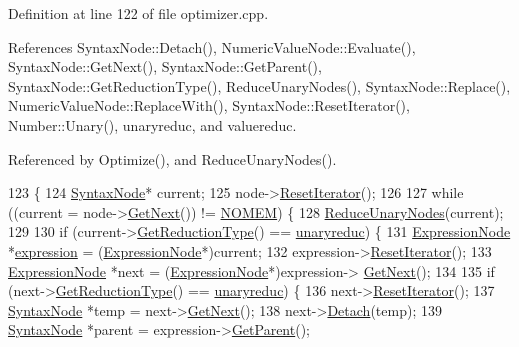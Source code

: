 Definition at line 122 of file optimizer.\+cpp.



References Syntax\+Node\+::\+Detach(), Numeric\+Value\+Node\+::\+Evaluate(), Syntax\+Node\+::\+Get\+Next(), Syntax\+Node\+::\+Get\+Parent(), Syntax\+Node\+::\+Get\+Reduction\+Type(), Reduce\+Unary\+Nodes(), Syntax\+Node\+::\+Replace(), Numeric\+Value\+Node\+::\+Replace\+With(), Syntax\+Node\+::\+Reset\+Iterator(), Number\+::\+Unary(), unaryreduc, and valuereduc.



Referenced by Optimize(), and Reduce\+Unary\+Nodes().


\begin{DoxyCode}
123 \{
124     \hyperlink{classSyntaxNode}{SyntaxNode}* current;
125     node->\hyperlink{classSyntaxNode_ac51307368fb255aa760b99e137178c89}{ResetIterator}();
126 
127     \textcolor{keywordflow}{while} ((current = node->\hyperlink{classSyntaxNode_af1fa46ba30aa4f2affa2d4e96a4be010}{GetNext}()) != \hyperlink{platform_8h_a46ff2bfbf0d44b8466a2251d5bd5e6f8}{NOMEM}) \{
128         \hyperlink{classOptimizer_aef8d80bb6301ee01a7ed271148438733}{ReduceUnaryNodes}(current);
129 
130         \textcolor{keywordflow}{if} (current->\hyperlink{classSyntaxNode_a5384fc779eee947b5e09bf2adb6cc606}{GetReductionType}() == \hyperlink{nodes_8h_ab321a69ad5704b704b8dd9e1b3984a29aba5ebaece27f25a5bb9dcdc5eb89846e}{unaryreduc}) \{
131             \hyperlink{classExpressionNode}{ExpressionNode} *\hyperlink{nodes_8h_acac9cbaeea226ed297804c012dc12b16ac810bbb61792a076f46cad2c89d87e1d}{expression} = (\hyperlink{classExpressionNode}{ExpressionNode}*)current;
132             expression->\hyperlink{classSyntaxNode_ac51307368fb255aa760b99e137178c89}{ResetIterator}();
133             \hyperlink{classExpressionNode}{ExpressionNode} *next = (\hyperlink{classExpressionNode}{ExpressionNode}*)expression->
      \hyperlink{classSyntaxNode_af1fa46ba30aa4f2affa2d4e96a4be010}{GetNext}();
134 
135             \textcolor{keywordflow}{if} (next->\hyperlink{classSyntaxNode_a5384fc779eee947b5e09bf2adb6cc606}{GetReductionType}() == \hyperlink{nodes_8h_ab321a69ad5704b704b8dd9e1b3984a29aba5ebaece27f25a5bb9dcdc5eb89846e}{unaryreduc}) \{
136                 next->\hyperlink{classSyntaxNode_ac51307368fb255aa760b99e137178c89}{ResetIterator}();
137                 \hyperlink{classSyntaxNode}{SyntaxNode} *temp = next->\hyperlink{classSyntaxNode_af1fa46ba30aa4f2affa2d4e96a4be010}{GetNext}();
138                 next->\hyperlink{classSyntaxNode_ae57f629a5c5fa0994f036c105396da69}{Detach}(temp);
139                 \hyperlink{classSyntaxNode}{SyntaxNode} *parent = expression->\hyperlink{classSyntaxNode_a4a85fd710ad44edbc5b3ac625c10cd08}{GetParent}();

\end{DoxyCode}
